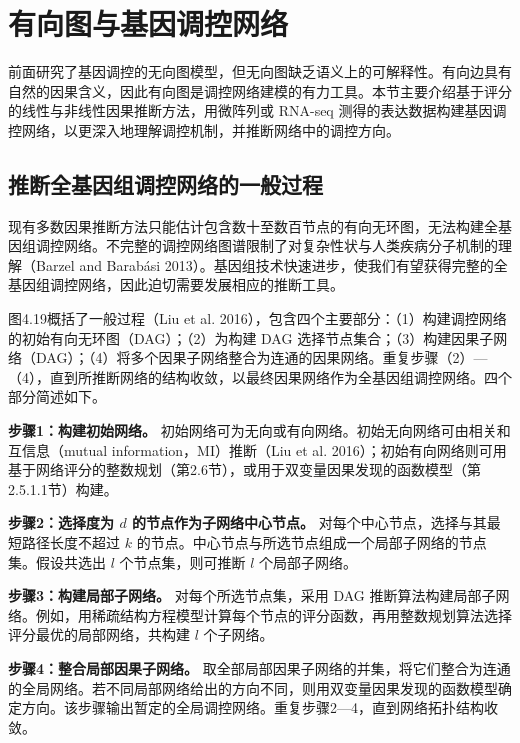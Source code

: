 \section{有向图与基因调控网络}

前面研究了基因调控的无向图模型，但无向图缺乏语义上的可解释性。有向边具有自然的因果含义，因此有向图是调控网络建模的有力工具。本节主要介绍基于评分的线性与非线性因果推断方法，用微阵列或 RNA-seq 测得的表达数据构建基因调控网络，以更深入地理解调控机制，并推断网络中的调控方向。

\subsection{推断全基因组调控网络的一般过程}
现有多数因果推断方法只能估计包含数十至数百节点的有向无环图，无法构建全基因组调控网络。不完整的调控网络图谱限制了对复杂性状与人类疾病分子机制的理解（Barzel and Barabási 2013）。基因组技术快速进步，使我们有望获得完整的全基因组调控网络，因此迫切需要发展相应的推断工具。

图4.19概括了一般过程（Liu et al. 2016），包含四个主要部分：（1）构建调控网络的初始有向无环图（DAG）；（2）为构建 DAG 选择节点集合；（3）构建因果子网络（DAG）；（4）将多个因果子网络整合为连通的因果网络。重复步骤（2）—（4），直到所推断网络的结构收敛，以最终因果网络作为全基因组调控网络。四个部分简述如下。


\par\medskip\noindent\textbf{步骤1：构建初始网络。}
初始网络可为无向或有向网络。初始无向网络可由相关和互信息（mutual information，MI）推断（Liu et al. 2016）；初始有向网络则可用基于网络评分的整数规划（第2.6节），或用于双变量因果发现的函数模型（第2.5.1.1节）构建。

\par\medskip\noindent\textbf{步骤2：选择度为 $d$ 的节点作为子网络中心节点。}
对每个中心节点，选择与其最短路径长度不超过 $k$ 的节点。中心节点与所选节点组成一个局部子网络的节点集。假设共选出 $l$ 个节点集，则可推断 $l$ 个局部子网络。

\par\medskip\noindent\textbf{步骤3：构建局部子网络。}
对每个所选节点集，采用 DAG 推断算法构建局部子网络。例如，用稀疏结构方程模型计算每个节点的评分函数，再用整数规划算法选择评分最优的局部网络，共构建 $l$ 个子网络。

\par\medskip\noindent\textbf{步骤4：整合局部因果子网络。}
取全部局部因果子网络的并集，将它们整合为连通的全局网络。若不同局部网络给出的方向不同，则用双变量因果发现的函数模型确定方向。该步骤输出暂定的全局调控网络。重复步骤2—4，直到网络拓扑结构收敛。

